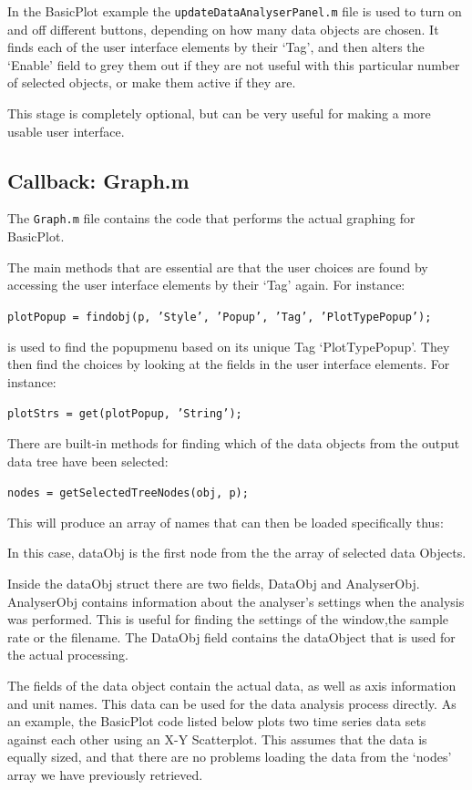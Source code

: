 \documentclass{article}
\begin{document}
In the BasicPlot example the \texttt{updateDataAnalyserPanel.m} file is used to turn on and off different buttons, depending on how many data objects are chosen. It finds each of the user interface elements by their `Tag', and then alters the `Enable' field to grey them out if they are not useful with this particular number of selected objects, or make them active if they are.

This stage is completely optional, but can be very useful for making a more usable user interface. 

\subsection{Callback: Graph.m}

The \texttt{Graph.m} file contains the code that performs the actual graphing for BasicPlot. 

The main methods that are essential are that the user choices are found by accessing the user interface elements by their `Tag' again. For instance:

\texttt{plotPopup = findobj(p, 'Style', 'Popup', 'Tag', 'PlotTypePopup');}

is used to find the popupmenu based on its unique Tag `PlotTypePopup'. They then find the choices by looking at the fields in the user interface elements. For instance:

\texttt{plotStrs  = get(plotPopup, 'String');}

There are built-in methods for finding which of the data objects from the output data tree have been selected: 

\texttt{nodes = getSelectedTreeNodes(obj, p);}

This will produce an array of names that can then be loaded specifically thus: 


In this case, dataObj is the first node from the the array of selected data Objects.

Inside the dataObj struct there are two fields, DataObj and AnalyserObj. AnalyserObj contains information about the analyser's settings when the analysis was performed. This is useful for finding the settings of the window,the sample rate or the filename. The DataObj field contains the dataObject that is used for the actual processing. 
 
The fields of the data object contain the actual data, as well as axis information and unit names. This data can be used for the data analysis process directly.  As an example, the BasicPlot code listed below plots two time series data sets against each other using an X-Y Scatterplot. This assumes that the data is equally sized, and that there are no problems loading the data from the `nodes' array we have previously retrieved.  
\end{document}
